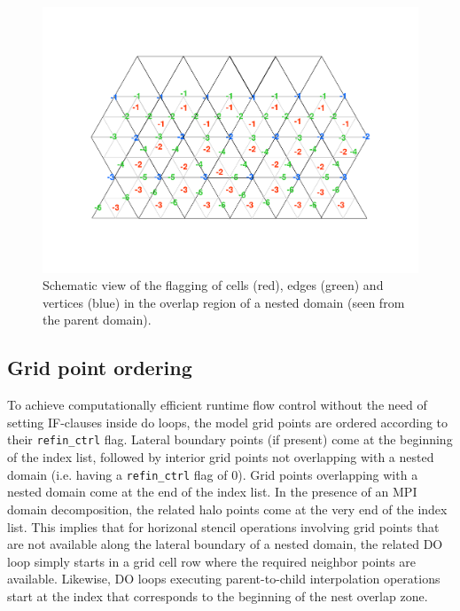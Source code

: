 \documentclass[11pt]{article}
\begin{document}
\begin{figure}[t!]
\vspace{-2cm}

\centering

\includegraphics[width=\textwidth]{./icondoc_fig2}

\vspace{-2cm}

 \caption{Schematic view of the flagging of cells (red), edges (green) and vertices (blue) in the
overlap region of a nested domain (seen from the parent domain).
}  
\end{figure}

\subsection{Grid point ordering}

To achieve computationally efficient runtime flow control without the need of setting IF-clauses inside
do loops, the model grid points are ordered according to their \verb+refin_ctrl+ flag. Lateral boundary
points (if present) come at the beginning of the index list, followed by interior grid points not overlapping
with a nested domain (i.e. having a \verb+refin_ctrl+ flag of 0). Grid points overlapping with a nested domain
come at the end of the index list. In the presence of an MPI domain decomposition, the related halo points
come at the very end of the index list. This implies that for horizonal stencil operations involving grid points
that are not available along the lateral boundary of a nested domain, the related DO loop simply starts in
a grid cell row where the required neighbor points are available. Likewise, DO loops executing parent-to-child 
interpolation operations start at the index that corresponds to the beginning of the nest overlap zone.
\end{document}
